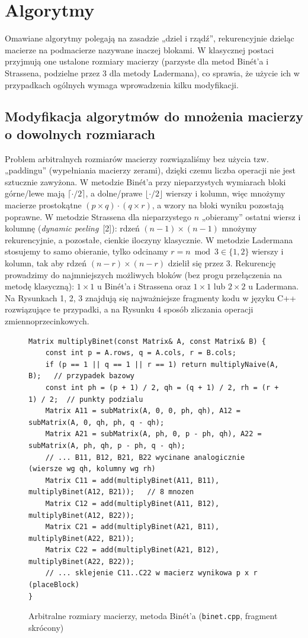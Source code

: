 \documentclass[11pt,a4paper]{article}
\begin{document}
\section{Algorytmy}
Omawiane algorytmy polegają na zasadzie „dziel i rządź'', rekurencyjnie dzieląc macierze na podmacierze nazywane
inaczej blokami. W klasycznej postaci przyjmują one ustalone rozmiary macierzy (parzyste dla metod Binét'a i Strassena,
podzielne przez 3 dla metody Ladermana), co sprawia, że użycie ich w przypadkach ogólnych wymaga wprowadzenia kilku
modyfikacji.

\subsection{Modyfikacja algorytmów do mnożenia macierzy o dowolnych rozmiarach}
Problem arbitralnych rozmiarów macierzy rozwiązaliśmy bez użycia tzw. „paddingu'' (wypełniania macierzy zerami),
dzięki czemu liczba operacji nie jest sztucznie zawyżona.
W metodzie Binét'a przy nieparzystych wymiarach bloki górne/lewe mają $\lceil\cdot/2\rceil$, a dolne/prawe
$\lfloor\cdot/2\rfloor$ wierszy i kolumn, więc mnożymy macierze prostokątne $(p\times q)\cdot(q\times r)$, a wzory na
bloki wyniku pozostają poprawne. W metodzie Strassena dla nieparzystego $n$ „obieramy'' ostatni wiersz i kolumnę
(\emph{dynamic peeling}~[2]): rdzeń $(n{-}1)\times(n{-}1)$ mnożymy rekurencyjnie, a pozostałe, cienkie iloczyny
klasycznie. W metodzie Ladermana stosujemy to samo obieranie, tylko odcinamy $r=n\bmod3\in\{1,2\}$ wierszy
i kolumn, tak aby rdzeń $(n{-}r)\times(n{-}r)$ dzielił się przez 3.
Rekurencję prowadzimy do najmniejszych możliwych bloków (bez progu przełączenia na metodę klasyczną):
$1\times1$ u Binét'a i Strassena oraz $1\times1$ lub $2\times2$ u Ladermana.
Na Rysunkach 1, 2, 3 znajdują się najważniejsze fragmenty kodu w języku C++ rozwiązujące te przypadki, a na
Rysunku 4 sposób zliczania operacji zmiennoprzecinkowych.

\begin{figure}[H]
\centering
\begin{lstlisting}
Matrix multiplyBinet(const Matrix& A, const Matrix& B) {
    const int p = A.rows, q = A.cols, r = B.cols;
    if (p == 1 || q == 1 || r == 1) return multiplyNaive(A, B);   // przypadek bazowy
    const int ph = (p + 1) / 2, qh = (q + 1) / 2, rh = (r + 1) / 2;  // punkty podzialu
    Matrix A11 = subMatrix(A, 0, 0, ph, qh), A12 = subMatrix(A, 0, qh, ph, q - qh);
    Matrix A21 = subMatrix(A, ph, 0, p - ph, qh), A22 = subMatrix(A, ph, qh, p - ph, q - qh);
    // ... B11, B12, B21, B22 wycinane analogicznie (wiersze wg qh, kolumny wg rh)
    Matrix C11 = add(multiplyBinet(A11, B11), multiplyBinet(A12, B21));   // 8 mnozen
    Matrix C12 = add(multiplyBinet(A11, B12), multiplyBinet(A12, B22));
    Matrix C21 = add(multiplyBinet(A21, B11), multiplyBinet(A22, B21));
    Matrix C22 = add(multiplyBinet(A21, B12), multiplyBinet(A22, B22));
    // ... sklejenie C11..C22 w macierz wynikowa p x r (placeBlock)
}
\end{lstlisting}
\caption{Arbitralne rozmiary macierzy, metoda Binét'a (\texttt{binet.cpp}, fragment skrócony)}
\end{figure}
\end{document}
